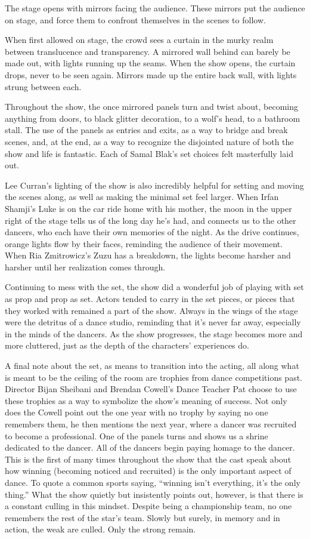 \documentclass[12pt]{article}[titlepage]
\newcommand{\say}[1]{``#1''}
\newcommand{\1}{\={a}}
\newcommand{\2}{\={e}}
\newcommand{\3}{\={\i}}
\newcommand{\4}{\=o}
\newcommand{\5}{\=u}
\newcommand{\6}{\={A}}
\renewcommand{\,}{\textsuperscript{,}}
\begin{document}
The stage opens with mirrors facing the audience.
These mirrors put the audience on stage, and force them to confront themselves in the scenes to follow.

When first allowed on stage, the crowd sees a curtain in the murky realm between translucence and transparency.
A mirrored wall behind can barely be made out, with lights running up the seams.
When the show opens, the curtain drops, never to be seen again.
Mirrors made up the entire back wall, with lights strung between each.

Throughout the show, the once mirrored panels turn and twist about, becoming anything from doors, to black glitter decoration, to a wolf's head, to a bathroom stall.
The use of the panels as entries and exits, as a way to bridge and break scenes, and, at the end, as a way to recognize the disjointed nature of both the show and life is fantastic.
Each of Samal Blak's set choices felt masterfully laid out.

Lee Curran's lighting of the show is also incredibly helpful for setting and moving the scenes along, as well as making the minimal set feel larger.
When Irfan Shamji's Luke is on the car ride home with his mother, the moon in the upper right of the stage tells us of the long day he's had, and connects us to the other dancers, who each have their own memories of the night.
As the drive continues, orange lights flow by their faces, reminding the audience of their movement.
When Ria Zmitrowicz's Zuzu has a breakdown, the lights become harsher and harsher until her realization comes through.

Continuing to mess with the set, the show did a wonderful job of playing with set as prop and prop as set.
Actors tended to carry in the set pieces, or pieces that they worked with remained a part of the show.
Always in the wings of the stage were the detritus of a dance studio, reminding that it's never far away, especially in the minds of the dancers.
As the show progresses, the stage becomes more and more cluttered, just as the depth of the characters' experiences do.

A final note about the set, as means to transition into the acting, all along what is meant to be the ceiling of the room are trophies from dance competitions past.
Director Bijan Sheibani and Brendan Cowell's Dance Teacher Pat choose to use these trophies as a way to symbolize the show's meaning of success.
Not only does the Cowell point out the one year with no trophy by saying no one remembers them, he then mentions the next year, where a dancer was recruited to become a professional.
One of the panels turns and shows us a shrine dedicated to the dancer.
All of the dancers begin paying homage to the dancer.
This is the first of many times throughout the show that the cast speak about how winning (becoming noticed and recruited) is the only important aspect of dance.
To quote a common sports saying, \say{winning isn't everything, it's the only thing.}
What the show quietly but insistently points out, however, is that there is a constant culling in this mindset.
Despite being a championship team, no one remembers the rest of the star's team.
Slowly but surely, in memory and in action, the weak are culled.
Only the strong remain.
\end{document}
